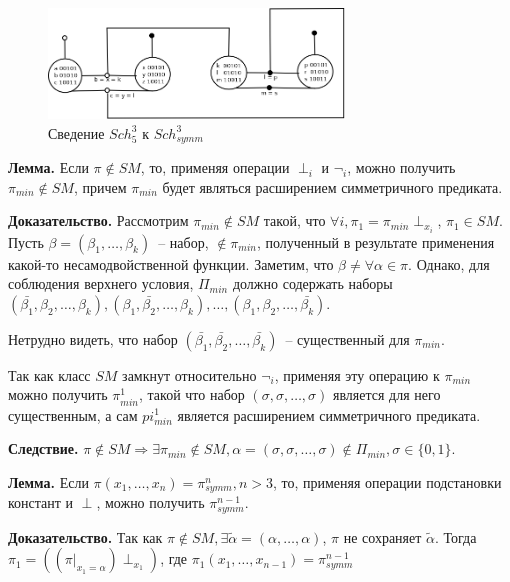 \documentclass[12pt]{article}
\begin{document}
\begin{figure}[htb]
\centering
\includegraphics[width=0.7\textwidth]{scheff5.png}
\caption{Сведение $Sch_5^3$ к $Sch_{symm}^3$}
\label{fig:scheff3_5}
\end{figure}



\label{eq:lemma_sm}
\textbf{Лемма.} Если $\pi \notin SM$, то, применяя операции $\perp_i$ и $\neg_i$,
можно получить $\pi_{min} \notin SM$, причем $\pi_{min}$ будет являться расширением симметричного предиката.

\textbf{Доказательство.} Рассмотрим $\pi_{min} \notin SM$ такой, что $\forall i, \pi_1 = \pi_{min} \perp_{x_i}$,
$\pi_1 \in SM$.
Пусть $\beta = (\beta_1, \dots, \beta_k)$~-- набор, $\notin \pi_{min}$, полученный в результате применения какой-то несамодвойственной функции.
Заметим, что $\beta \neq \forall \alpha \in \pi$. Однако, для соблюдения верхнего условия,
$\Pi_{min}$ должно содержать наборы 
$(\bar{\beta_1}, \beta_2, \dots, \beta_k), (\beta_1, \bar{\beta_2}, \dots, \beta_k), \dots, (\beta_1, \beta_2, \dots, \bar{\beta_k})$.

Нетрудно видеть, что набор $(\bar{\beta_1}, \bar{\beta_2}, \dots, \bar{\beta_k})$~-- существенный для $\pi_{min}$.

Так как класс $SM$ замкнут относительно $\neg_i$, применяя эту операцию к $\pi_{min}$ можно получить $\pi_{min}^1$,
такой что набор $(\sigma, \sigma, \dots, \sigma)$ является для него существенным, а сам $pi_{min}^1$ является расширением 
симметричного предиката.

\textbf{Следствие.} $\pi \notin SM \Longrightarrow \exists \pi_{min} \notin SM, 
\alpha = (\sigma, \sigma, \dots, \sigma) \notin \Pi_{min}, \sigma \in \{0, 1\}$.

\textbf{Лемма.} Если $\pi(x_1, \dots, x_n) = \pi_{symm}^n, n > 3$, то, применяя операции подстановки констант и $\perp$, можно
получить $\pi_{symm}^{n-1}$.

\textbf{Доказательство.} Так как 
$\pi \notin SM, \exists \widetilde{\alpha} = (\alpha, \dots, \alpha)$, $\pi$ не сохраняет $\widetilde{\alpha}$.
Тогда 
$\pi_1 = ( (\pi|_{x_1=\alpha}) \perp_{x_1} )$, где $\pi_1(x_1, \dots, x_{n-1}) = \pi_{symm}^{n-1}$
\end{document}
